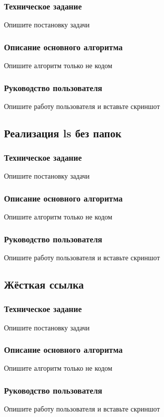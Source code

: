 \documentclass[a4paper,14pt]{extarticle}
\begin{document}
\subsubsection{Техническое задание}
Опишите постановку задачи

\subsubsection{Описание основного алгоритма}
Опишите алгоритм только не кодом

\subsubsection{Руководство пользователя}
Опишите работу пользователя и вставьте скриншот

\subsection{Реализация ls без папок}
\subsubsection{Техническое задание}
Опишите постановку задачи

\subsubsection{Описание основного алгоритма}
Опишите алгоритм только не кодом

\subsubsection{Руководство пользователя}
Опишите работу пользователя и вставьте скриншот

\subsection{Жёсткая ссылка}
\subsubsection{Техническое задание}
Опишите постановку задачи

\subsubsection{Описание основного алгоритма}
Опишите алгоритм только не кодом

\subsubsection{Руководство пользователя}
Опишите работу пользователя и вставьте скриншот
\end{document}
